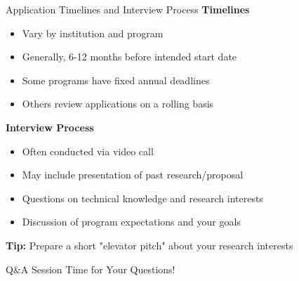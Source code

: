 \documentclass[aspectratio=169,10pt]{beamer}
\begin{document}
\begin{frame}{Application Timelines and Interview Process}
    \textbf{Timelines}
    \begin{itemize}
        \item Vary by institution and program
        \item Generally, 6-12 months before intended start date
        \item Some programs have fixed annual deadlines
        \item Others review applications on a rolling basis
    \end{itemize}
    
    \textbf{Interview Process}
    \begin{itemize}
        \item Often conducted via video call
        \item May include presentation of past research/proposal
        \item Questions on technical knowledge and research interests
        \item Discussion of program expectations and your goals
    \end{itemize}
    
    \textbf{Tip:} Prepare a short "elevator pitch" about your research interests
\end{frame}

\begin{frame}{Q\&A Session}
    \centering
    \large{Time for Your Questions!}
    
    \vspace{1cm}
    
\end{frame}
\end{document}
